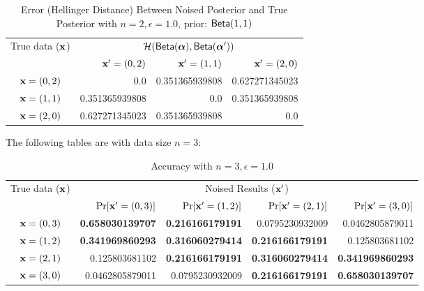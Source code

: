 \documentclass{article}
\begin{document}
\begin{table}[htbp]
\vspace{-0.8cm}
	\scriptsize
	\centering
	\caption{Error (Hellinger Distance) Between Noised Posterior and True Posterior with $n = 2, \epsilon = 1.0$, prior: $\mathsf{Beta}(1,1)$}
	\label{tab_n2error}
\vspace{-0.2cm}
\begin{tabular}{|c||r|r|r|}
	\hline

	\multirow{2}{*}{True data ($\textbf{x}$)}
								& \multicolumn{3}{c|}{$\mathcal{H}(\mathsf{Beta}(\boldsymbol{\alpha}), \mathsf{Beta}(\boldsymbol{\alpha}'))$}
								\\ \cline{2-4}
	                      		& $\textbf{x}' = (0, 2)$
	                      		& $\textbf{x}' = (1, 1)$
	                      		& $\textbf{x}' = (2, 0)$
	                      		\\  \hline \hline
	$\textbf{x} = (0,2)$          & 0.0	
								& 0.351365939808
								& 0.627271345023 
								\\  \hline
	$\textbf{x} = (1,1)$          & 0.351365939808	
								& 0.0			
								& 0.351365939808
								\\  \hline
	$\textbf{x} = (2,0)$          & 0.627271345023
								& 0.351365939808 			
								& 0.0
								\\  \hline
\end{tabular}
\end{table}


\clearpage
The following tables are with data size $n = 3:$

\begin{table}[htbp]
	\vspace{-0.5cm}
	\footnotesize
	\centering
	\caption{Accuracy with $n = 3, \epsilon = 1.0$}
	\label{tab_n3eps1.0prob}
\begin{tabular}{|c||r|r|r|r|}
	\hline
	\multirow{2}{*}{True data ($\textbf{x}$)}
								& \multicolumn{4}{c|}{Noised Results ($\textbf{x}'$)}  
								\\ \cline{2-5}
	                      		&  $\Pr[\textbf{x}' = (0, 3)]$  	
	                      		&  $\Pr[\textbf{x}' = (1, 2)]$ 	
	                      		&  $\Pr[\textbf{x}' = (2, 1)]$ 	
	                      		&  $\Pr[\textbf{x}' = (3, 0)]$ 	
	                      		\\  \hline
	                      		\hline
	$\textbf{x} = (0,3)$          & {\bf 0.658030139707}	
								& {\bf 0.216166179191}	
								&  0.0795230932009
								&  0.0462805879011
								\\  \hline
	$\textbf{x} = (1,2)$          & {\bf 0.341969860293}	
								& {\bf 0.316060279414}			
								& {\bf 0.216166179191}
								&  0.125803681102
								\\  \hline
	$\textbf{x} = (2,1)$          & 0.125803681102
								& {\bf 0.216166179191}			
								& {\bf 0.316060279414}
								& {\bf 0.341969860293} 
								\\  \hline
	$\textbf{x} = (3,0)$          & 0.0462805879011
								& 0.0795230932009 			
								& {\bf 0.216166179191}
								& {\bf 0.658030139707} 
								\\  \hline
\end{tabular}
\end{table}
\end{document}

